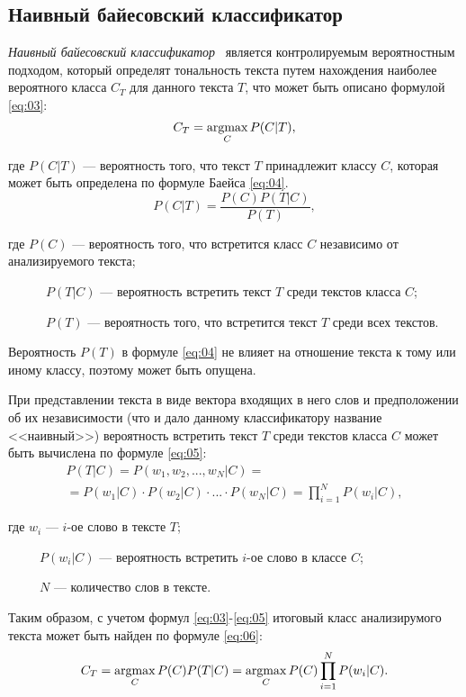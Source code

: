 \subsection{Наивный байесовский классификатор}

\textit{Наивный байесовский классификатор}~\cite{article21} является
контролируемым вероятностным подходом, который определят тональность текста
путем нахождения наиболее вероятного класса $C_T$ для данного текста $T$, что
может быть описано формулой \ref{eq:03}:
\begin{equation}\label{eq:03}
    C_T = \operatorname*{argmax}_C P(C|T),
\end{equation}

где $P(C|T)$ --- вероятность того, что текст $T$ принадлежит классу $C$,
которая может быть определена по формуле Баейса \ref{eq:04}.
\begin{equation}\label{eq:04}
    P(C|T) = \frac{P(C)P(T|C)}{P(T)},
\end{equation}

где $P(C)$ --- вероятность того, что встретится класс $C$ независимо от
анализируемого текста;

~~~~~~$P(T|C)$ --- вероятность встретить текст $T$ среди текстов класса $C$;

~~~~~~$P(T)$ --- вероятность того, что встретится текст $T$ среди всех текстов.

Вероятность $P(T)$ в формуле \ref{eq:04} не влияет на отношение текста к тому
или иному классу, поэтому может быть опущена.

При представлении текста в виде вектора входящих в него слов и предположении об
их независимости (что и дало данному классификатору название <<наивный>>)
вероятность встретить текст $T$ среди текстов класса $C$ может быть вычислена по
формуле \ref{eq:05}:
\begin{multline}\label{eq:05}
    P(T|C) = P(w_1, w_2, ..., w_N|C) = \\ =P(w_1|C) \cdot P(w_2|C) \cdot ...
    \cdot P(w_N|C) = \prod\limits_{i=1}^{N} P(w_i|C),
\end{multline}

где $w_i$ --- $i$-ое слово в тексте $T$;

~~~~~$P(w_i|C)$ --- вероятность встретить $i$-ое слово в классе $C$;

~~~~~$N$ --- количество слов в тексте.

Таким образом, с учетом формул \ref{eq:03}-\ref{eq:05} итоговый класс
анализирумого текста может быть найден по формуле \ref{eq:06}:
\begin{equation}\label{eq:06}
    C_T = \operatorname*{argmax}_C P(C)P(T|C) = \operatorname*{argmax}_C P(C)\prod\limits_{i=1}^{N} P(w_i|C).
\end{equation}


